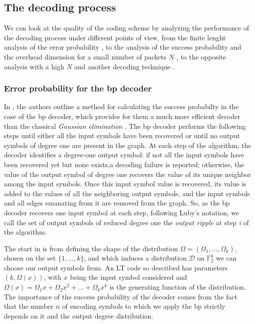 \subsection{The decoding process}
We can look at the quality of the coding scheme by analyzing the performance of the decoding process under different points of view, from the finite lenght analysis of the error probability \cite{Karp2004}, to the analysis of the success probability and the overhead dimension for a small number of packets $N$ \cite{Hyytia2007}, to the opposite analysis with a high $N$ and another decoding technique \cite{Lu}.

\subsubsection{Error probability for the \gls{bp} decoder}
In \cite{Karp2004}, the authors outline a method for calculating the success probabilty in the case of the \gls{bp} decoder, which provides for them a much more efficient decoder than the classical \textit{Gaussian elimination} \cite{Shokrollahi2006}. The \gls{bp} decoder performs the following steps until either all the input symbols have been recovered or until no output symbols of degree one are present in the graph. At each step of the algorithm, the decoder identifies a degree-one output symbol: if not all the input symbols have been recovered yet but none exists,a decoding failure is reported; otherwise, the value of the output symbol of degree one recovers the value of its unique neighbor among the input symbols. Once this input symbol value is recovered, its value is added to the values of all the neighboring output symbols, and the input symbols and all edges emanating from it are removed from the graph. So, as the \gls{bp} decoder recovers one input symbol at each step, following Luby’s notation, we call the set of output symbols of reduced degree one the \textit{output ripple} at step \textit{i} of the algorithm. \cite{Shokrollahi2006}

The start in \cite{Karp2004} is from defining the shape of the distribution $\Omega = (\Omega_1,\dots,\Omega_k)$, chosen on the set $\{1,\dots,k\}$, and which induces a distribution $\mathcal{D}$ on $\mathbb{F}_2^k$ we can choose our output symbols from. An LT code so described has parameters $(k,\Omega(x))$, with $x$ being the input symbol considered and $\Omega(x) = \Omega_1x+\Omega_2x^2+\dots+\Omega_kx^k$ is the generating function of the distribution. The importance of the success probability of the decoder comes from the fact that the number $n$ of encoding symbols to which we apply the \gls{bp} strictly depends on it and the output degree distribution.

